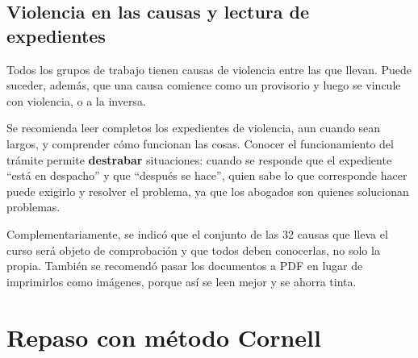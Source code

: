 \documentclass[12pt,oneside]{book}
\begin{document}
\section{Violencia en las causas y lectura de expedientes}

Todos los grupos de trabajo tienen causas de violencia entre las que llevan. Puede suceder, además, que una causa comience como un provisorio y luego se vincule con violencia, o a la inversa. %

Se recomienda leer completos los expedientes de violencia, aun cuando sean largos, y comprender cómo funcionan las cosas. Conocer el funcionamiento del trámite permite \textbf{destrabar} situaciones: cuando se responde que el expediente ``está en despacho'' y que ``después se hace'', quien sabe lo que corresponde hacer puede exigirlo y resolver el problema, ya que los abogados son quienes solucionan problemas.

\begin{note}
Complementariamente, se indicó que el conjunto de las 32 causas que lleva el curso será objeto de comprobación y que todos deben conocerlas, no solo la propia. También se recomendó pasar los documentos a PDF en lugar de imprimirlos como imágenes, porque así se leen mejor y se ahorra tinta.
\end{note}

\chapter[Repaso Cornell]{Repaso con método Cornell}
\end{document}
